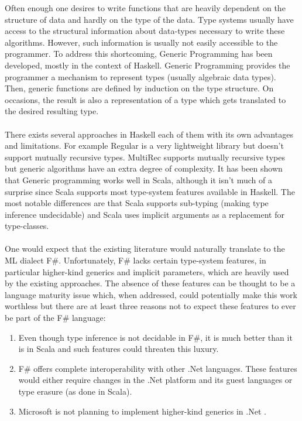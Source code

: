 \documentclass[8pt]{extarticle}
\begin{document}
Often enough one desires to write functions that are heavily dependent on the structure of data and hardly on the type of the data. Type systems usually have access to the structural information about data-types necessary to write these algorithms. However, such information is usually not easily accessible to the programmer. To address this shortcoming, Generic Programming has been developed, mostly in the context of Haskell. Generic Programming provides the programmer a mechanism to represent types (usually algebraic data types). Then, generic functions are defined by induction on the type structure. On occasions, the result is also a representation of a type which gets translated to the desired resulting type.
\\\\
There exists several approaches in Haskell\cite{SYB,Regular,MultiRec,RepLib} each of them with its own advantages and limitations. For example Regular\cite{Regular} is a very lightweight library but doesn't support mutually recursive types. MultiRec\cite{MultiRec} supports mutually recursive types but generic algorithms have an extra degree of complexity. It has been shown that Generic programming works well in Scala\cite{ScalaGen}, although it isn't much of a surprise since Scala supports most type-system features available in Haskell. The most notable differences are that Scala supports sub-typing (making type inference undecidable) and Scala uses implicit arguments as a replacement for type-classes.
\\\\
One would expect that the existing literature would naturally translate to the ML dialect F\#. Unfortunately, F\# lacks certain type-system features, in particular higher-kind generics and implicit parameters, which are heavily used by the existing approaches\cite{SYB,Regular,MultiRec}. The absence of these features can be thought to be a language maturity issue which, when addressed, could potentially make this work worthless but there are at least three reasons not to expect these features to ever be part of the F\# language:
\begin{enumerate}
  \item Even though type inference is not decidable in F\#, it is much better than it is in Scala and such features could threaten this luxury.
  \item F\# offers complete interoperability with other .Net languages. These features would either require changes in the .Net platform and its guest languages or type erasure (as done in Scala).
  \item Microsoft is not planning to implement higher-kind generics in .Net \cite{NoKinds}.
\end{enumerate}
\end{document}
